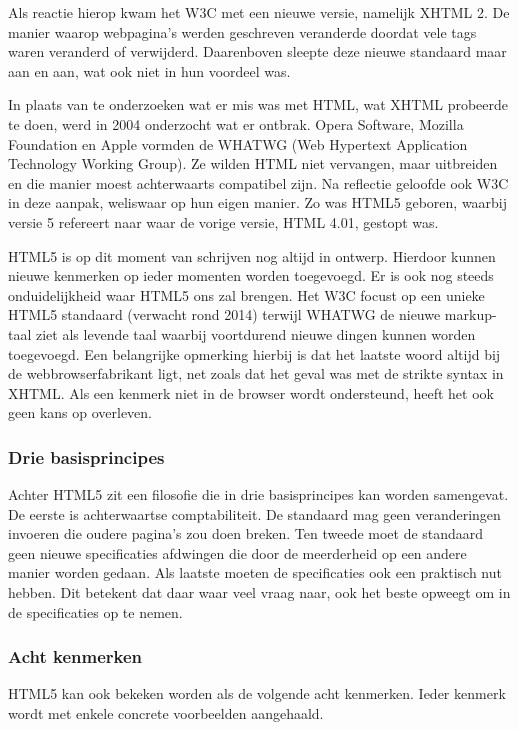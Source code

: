 Als reactie hierop kwam het W3C met een nieuwe versie, namelijk XHTML 2. De manier waarop webpagina's werden geschreven veranderde doordat vele tags waren veranderd of verwijderd. Daarenboven sleepte deze nieuwe standaard maar aan en aan, wat ook niet in hun voordeel was. 

In plaats van te onderzoeken wat er mis was met HTML, wat XHTML probeerde te doen, werd in 2004 onderzocht wat er ontbrak. Opera Software, Mozilla Foundation en Apple vormden de WHATWG (Web Hypertext Application Technology Working Group). Ze wilden HTML niet vervangen, maar uitbreiden en die manier moest achterwaarts compatibel zijn. Na reflectie geloofde ook W3C in deze aanpak, weliswaar op hun eigen manier.  Zo was HTML5 geboren, waarbij versie 5 refereert naar waar de vorige versie, HTML 4.01, gestopt was.

HTML5 is op dit moment van schrijven nog altijd in ontwerp. Hierdoor kunnen nieuwe kenmerken op ieder momenten worden toegevoegd.  Er is ook nog steeds onduidelijkheid waar HTML5 ons zal brengen.  Het W3C focust op een unieke HTML5 standaard (verwacht rond 2014) terwijl WHATWG de nieuwe markup-taal ziet als levende taal waarbij voortdurend  nieuwe dingen kunnen worden toegevoegd. Een belangrijke opmerking hierbij is dat het laatste woord altijd bij de webbrowserfabrikant ligt, net zoals dat het geval was met de strikte syntax in XHTML. Als een kenmerk niet in de browser wordt ondersteund, heeft het ook geen kans op overleven.

\subsubsection{Drie basisprincipes}
Achter HTML5 zit een filosofie die in drie basisprincipes kan worden samengevat.  De eerste is achterwaartse comptabiliteit. De standaard mag geen veranderingen invoeren die oudere pagina's zou doen breken. Ten tweede moet de standaard geen nieuwe specificaties afdwingen die door de meerderheid op een andere manier worden gedaan. Als laatste moeten de specificaties ook een praktisch nut hebben. Dit betekent dat daar waar veel vraag naar, ook het beste opweegt om in de specificaties op te nemen.

\subsubsection{Acht kenmerken}
HTML5 kan ook bekeken worden als de volgende acht kenmerken. Ieder kenmerk wordt met enkele concrete voorbeelden aangehaald.

